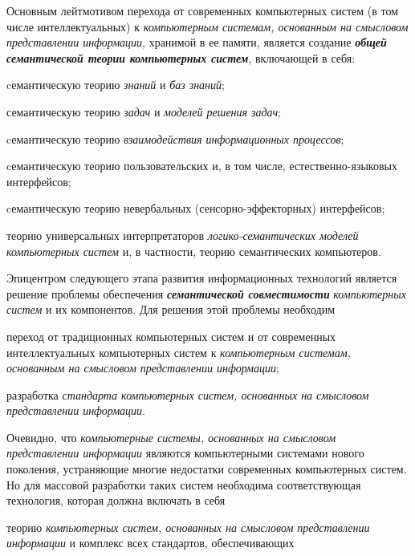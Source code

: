 \begin{SCn}
\begin{scnsubstruct}
{			Основным лейтмотивом перехода от современных компьютерных систем (в том числе интеллектуальных) к
			\textit{компьютерным системам, основанным на смысловом представлении
				информации}, хранимой в ее памяти, является создание \textbf{\textit{общей
					семантической теории компьютерных систем}}, включающей в себя:
			\begin{scnitemize}
				\item cемантическую теорию \textit{знаний} и \textit{баз знаний};
				\item семантическую теорию \textit{задач} и \textit{моделей решения
					задач};
				\item cемантическую теорию \textit{взаимодействия информационных
					процессов};
				\item cемантическую теорию пользовательских и, в том числе,
				естественно-языковых интерфейсов;
				\item cемантическую теорию невербальных (сенсорно-эффекторных)
				интерфейсов;
				\item теорию универсальных интерпретаторов \textit{логико-семантических
					моделей компьютерных систем} и, в частности, теорию семантических компьютеров.
			\end{scnitemize}
			Эпицентром следующего этапа развития информационных технологий является
			решение проблемы обеспечения \textbf{\textit{семантической совместимости}}
			\textit{компьютерных систем} и их компонентов. Для решения этой проблемы
			необходим
			\begin{scnitemize}
				\item переход от традиционных компьютерных систем и от современных
				интеллектуальных компьютерных систем к \textit{компьютерным системам,
					основанным на смысловом представлении информации};
				\item разработка \textit{стандарта компьютерных систем, основанных на
					смысловом представлении информации}.
			\end{scnitemize}
			Очевидно, что \textit{компьютерные системы, основанных на смысловом
				представлении информации} являются компьютерными системами нового поколения,
			устраняющие многие недостатки современных компьютерных систем. Но для массовой
			разработки таких систем необходима соответствующая технология, которая должна
			включать в себя
			\begin{scnitemize}
				\item теорию \textit{компьютерных систем, основанных на смысловом
					представлении информации} и комплекс всех стандартов, обеспечивающих

\end{scnitemize}}
\end{scnsubstruct}
\end{SCn}
